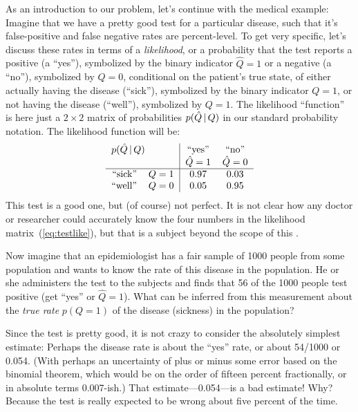 \documentclass[12pt,twoside]{article}
\begin{document}
As an introduction to our problem, let's continue with the medical
example: Imagine that we have a pretty good test for a particular
disease, such that it's false-positive and false negative rates are
percent-level.  To get very specific, let's discuss these rates in
terms of a \emph{likelihood}, or a
probability that the test reports a positive (a ``yes''), symbolized
by the binary indicator $\hat{Q}=1$ or a negative (a ``no''),
symbolized by $\hat{Q}=0$, conditional on the patient's true state, of
either actually having the disease (``sick''), symbolized by the
binary indicator $Q=1$, or not having the disease (``well''),
symbolized by $Q=1$.  The likelihood ``function'' is here just a
$2\times 2$ matrix of probabilities $p(\hat{Q}\,|\, Q)$ in our
standard probability notation.  The likelihood function will be:
\begin{equation}\label{eq:testlike}
\mbox{\begin{tabular}{rc|cc}
\multicolumn{2}{l|}{$p(\hat{Q}\given Q)$}
               & ``yes'' & ``no'' \\
             & & $\hat{Q}=1$ & $\hat{Q}=0$ \\
\hline
``sick'' & $Q=1$ & $0.97$ & $0.03$ \\
``well'' & $Q=0$ & $0.05$ & $0.95$
\end{tabular}}
\end{equation}
This test is a good one, but (of course) not perfect.  It is not clear
how any doctor or researcher could accurately know the four numbers in
the likelihood matrix~(\ref{eq:testlike}), but that is a subject
beyond the scope of this \documentname.

Now imagine that an epidemiologist has a fair sample of 1000 people
from some population and wants to know the rate of this disease in the
population.  He or she administers the test to the subjects and finds
that 56 of the 1000 people test positive (get ``yes'' or $\hat{Q}=1$).
What can be inferred from this measurement about the \emph{true
  rate}  $p(Q=1)$ of the disease (sickness) in the
population?

Since the test is pretty good, it is not crazy to consider the
absolutely simplest estimate: Perhaps the disease rate is about the
``yes'' rate, or about 54/1000 or 0.054.  (With perhaps an uncertainty
of plus or minus some error based on the binomial theorem, which would
be on the order of fifteen percent fractionally, or in absolute terms
0.007-ish.)  That estimate---0.054---is a bad estimate!  Why?  Because
the test is really expected to be wrong about five percent of the time.
\end{document}
